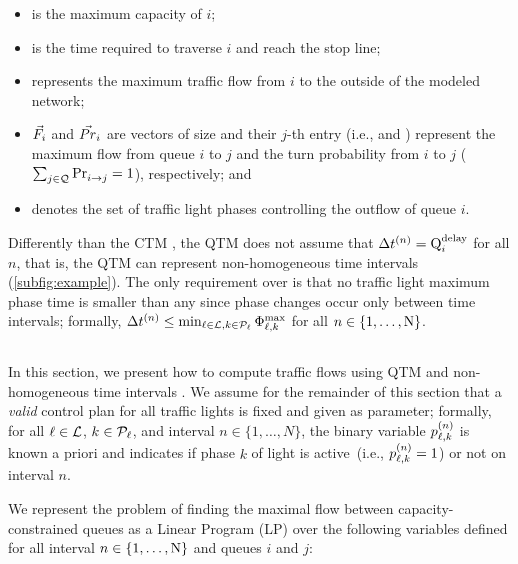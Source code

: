 \begin{itemize}
%
\item {} is the maximum capacity of $i$;
%
\item {} is the time required to traverse $i$ and reach the stop line;
%
\item {} represents the maximum traffic flow from $i$ to the outside of
  the modeled network;
%
\item $\Fvec_i$ and $\Prvec_i$ are vectors of size \Qn and their $j$-th entry
  (i.e.,  and ) represent the maximum flow from queue $i$
  to $j$ and the turn probability from $i$ to $j$ ($\sum_{j \in
  \Qset}\FTURN{i}{j} = 1$), respectively; and
%
\item {} denotes the set of traffic light phases controlling the outflow
  of queue $i$.
%
\end{itemize}


Differently than the CTM \cite{daganzo1994cell,lin2004enhanced}, the QTM does not assume
that $\DT[n] = \QDELAY{i}$ for all $n$, that is, the QTM can represent
non-homogeneous time intervals (\cref{subfig:example}).
%
The only requirement over \DT[n] is that no traffic light maximum phase time is
smaller than any \DT[n] since phase changes occur only between time intervals;
formally, $\DT[n] \le \min_{\tl \in \Lset, k \in \Pset_\tl} \PTMAX{\tl}{k}$ for
all $n \in \{1,\dots,\Nn\}$.
%



\subsection{}

In this section, we present how to compute traffic flows using QTM and
non-homogeneous time intervals \DT[].
%
We assume for the remainder of this section that a \emph{valid} control plan for
all traffic lights is fixed and given as parameter;
%
formally, for all $\tl \in \Lset$, $k \in \Pset_\tl$, and interval $n \in
\{1,\dots,N\}$, the binary variable $\p{\tl}{k}$ is known a priori and indicates
if phase $k$ of light \tl is active~(i.e., $\p{\tl}{k} = 1$) or not on interval
$n$.


We represent the problem of finding the maximal flow between capacity-constrained 
queues as a Linear Program
(LP) over the following variables defined for all interval $n \in
\{1,\dots,\Nn\}$ and queues $i$ and $j$:

